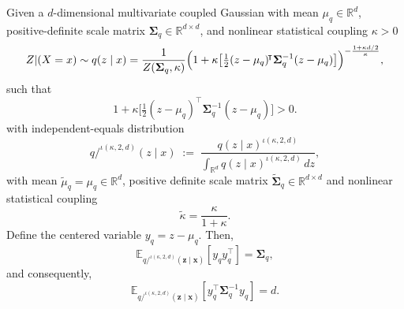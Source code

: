\documentclass[twoside,11pt]{article}
\begin{document}
\begin{lemma}\label{second_moment}
Given a $d$-dimensional multivariate coupled Gaussian with mean $\mu_q \in \mathbb{R}^d$, positive-definite scale matrix $\boldsymbol{\Sigma}_q \in \mathbb{R}^{d \times d}$, and nonlinear statistical coupling $\kappa>0$
\begin{equation}
Z|(X=x) \sim q(z \mid x) = \frac{1}{Z(\boldsymbol{\Sigma}_q, \kappa)}
\Bigl(1 + \kappa \bigl[\tfrac{1}{2}(z-\mu_q)^{\!\intercal} \boldsymbol{\Sigma}_q^{-1} (z-\mu_q)\bigr]\Bigr)^{-\frac{1 + \kappa d/2}{\kappa}}, 
\end{equation}
such that
\[
1 + \kappa \bigl[\tfrac{1}{2}(z-\mu_q)^{\!\intercal} \boldsymbol{\Sigma}_q^{-1} (z-\mu_q)\bigr] >0.
\]
with independent-equals distribution 
\begin{equation}
q/^{\iota(\kappa,2,d)}(z \mid x)
\;:=\;\frac{
q(z \mid x)^{\iota(\kappa,2,d)}
}{\int_{\mathbb{R}^d}
q(z \mid x)^{\iota(\kappa,2,d)}
\, dz},
\end{equation}
with mean $\tilde{\mu}_q = \mu_q \in \mathbb{R}^d$, positive definite scale matrix $\widetilde{\boldsymbol{\Sigma}}_q \in \mathbb{R}^{d \times d}$ and nonlinear statistical coupling
\[
\tilde{\kappa} = \frac{\kappa}{1+\kappa}.
\]
Define the centered variable $y_q= z - \mu_q$. Then,
\[
\mathbb{E}_{q/^{\iota(\kappa,2,d)}(\textbf{z}\mid \textbf{x})}
\!\left[y_q y_q^\intercal\right]
=\boldsymbol{\Sigma}_q,
\]
and consequently,
\[
\mathbb{E}_{q/^{\iota(\kappa,2,d)}(\textbf{z}\mid \textbf{x})}
\!\left[y_q^\intercal \boldsymbol{\Sigma}_q^{-1} y_q\right]=d.
\]
\end{lemma}
\end{document}

